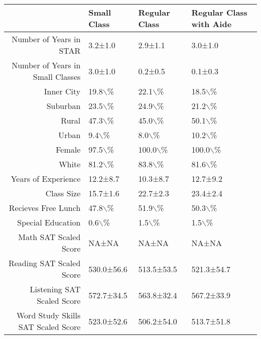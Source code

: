 \begin{table}[ht]
\centering
\begin{tabular}{rlll}
  \hline
 & Small Class & Regular Class & Regular Class with Aide \\ 
  \hline
Number of Years in STAR & 3.2±1.0 & 2.9±1.1 & 3.0±1.0 \\ 
  Number of Years in Small Classes & 3.0±1.0 & 0.2±0.5 & 0.1±0.3 \\ 
  Inner City & 19.8$\backslash$\% & 22.1$\backslash$\% & 18.5$\backslash$\% \\ 
  Suburban & 23.5$\backslash$\% & 24.9$\backslash$\% & 21.2$\backslash$\% \\ 
  Rural & 47.3$\backslash$\% & 45.0$\backslash$\% & 50.1$\backslash$\% \\ 
  Urban & 9.4$\backslash$\% & 8.0$\backslash$\% & 10.2$\backslash$\% \\ 
  Female & 97.5$\backslash$\% & 100.0$\backslash$\% & 100.0$\backslash$\% \\ 
  White & 81.2$\backslash$\% & 83.8$\backslash$\% & 81.6$\backslash$\% \\ 
  Years of Experience & 12.2±8.7 & 10.3±8.7 & 12.7±9.2 \\ 
  Class Size & 15.7±1.6 & 22.7±2.3 & 23.4±2.4 \\ 
  Recieves Free Lunch & 47.8$\backslash$\% & 51.9$\backslash$\% & 50.3$\backslash$\% \\ 
  Special Education & 0.6$\backslash$\% & 1.5$\backslash$\% & 1.5$\backslash$\% \\ 
  Math SAT Scaled Score & NA±NA & NA±NA & NA±NA \\ 
  Reading SAT Scaled Score & 530.0±56.6 & 513.5±53.5 & 521.3±54.7 \\ 
  Listening SAT Scaled Score & 572.7±34.5 & 563.8±32.4 & 567.2±33.9 \\ 
  Word Study Skills SAT Scaled Score & 523.0±52.6 & 506.2±54.0 & 513.7±51.8 \\ 
   \hline
\end{tabular}
\end{table}
